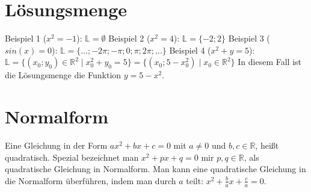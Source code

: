 \documentclass[12pt]{article}
\begin{document}
\section{Lösungsmenge}
	Beispiel 1 ($x^2=-1$):\newline
	$\mathbb{L} = \emptyset$ \newline\newline
	Beispiel 2 ($x^2 = 4$):\newline
	$\mathbb{L} = \{-2;2\}$\newline\newline
	Beispiel 3 ($sin(x) = 0$):\newline
	$\mathbb{L} = \{...;-2\pi;-\pi;0;\pi;2\pi; ...\}$\newline\newline
	Beispiel 4 ($x^2 + y = 5$):\newline
	$\mathbb{L} = \{(x_0;y_0)\in\mathbb{R}^2\mid x^2_0 + y_0 = 5\} = \{(x_0;5-x^2_0) \mid x_0\in\mathbb{R}^2\}$\newline\newline
	In diesem Fall ist die Lösungsmenge die Funktion $y=5-x^2$.\newline
	\begin{center}
	\end{center}
\section{Normalform}
	Eine Gleichung in der Form $ax^2+bx+c=0$ mit $a\neq0$ und $b,c\in \mathbb{R}$, heißt quadratisch. Spezial bezeichnet man $x^2+px+q=0$ mir $p,q\in \mathbb{R}$, als quadratische Gleichung in Normalform.\newline\newline
	Man kann eine quadratische Gleichung in die Normalform überführen, indem man durch $a$ teilt: $x^2+\frac{b}{a}x+\frac{c}{a}=0$.
\end{document}
